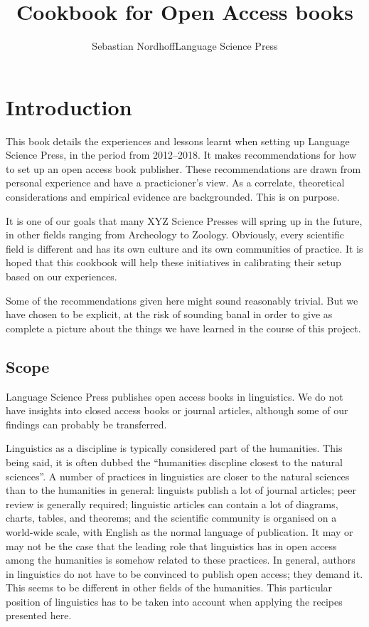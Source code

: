 \documentclass[guidelines,nonflat,modfonts] {langsci/langscibook}
\title{Cookbook for Open Access books}
\author{Sebastian Nordhoff\newlineCover Language Science Press}
\begin{document}
\maketitle
\frontmatter 
\tableofcontents 
\mainmatter
\chapter{Introduction}
\largerpage
This book details the experiences and lessons learnt when setting up Language Science Press, in the period from 2012--2018. It makes recommendations for how to set up an open access book publisher. These recommendations are drawn from personal experience and have a practicioner's view. As a correlate, theoretical considerations and empirical evidence are backgrounded. This is on purpose. 

It is one of our goals that many XYZ Science Presses will spring up in the future, in other fields ranging from Archeology to Zoology. Obviously, every scientific field is different and has its own culture and its own communities of practice. It is hoped that this cookbook will help these initiatives in calibrating their setup based on our experiences. 

Some of the recommendations given here might sound reasonably trivial. But we have chosen to be explicit, at the risk of sounding banal in order to give as complete a picture about the things we have learned in the course of this project.

\section{Scope}
Language Science Press publishes open access books in linguistics. We do not have insights into closed access books or journal articles, although some of our findings can probably be transferred. 

Linguistics as a discipline is typically considered part of the humanities. This being said, it is often dubbed the ``humanities discpline closest to the natural sciences''. A number of practices in linguistics are closer to the natural sciences than to the humanities in general: linguists publish a lot of journal articles; peer review is generally required; linguistic articles can contain a lot of diagrams, charts, tables, and theorems; and the scientific community is organised on a world-wide scale, with English as the normal language of publication. It may or may not be the case that the leading role that linguistics has in open access among the humanities is somehow related to these practices. In general, authors in linguistics do not have to be convinced to publish open access; they demand it. This seems to be different in other fields of the humanities. This particular position of linguistics has to be taken into account when applying the recipes presented here. 
\end{document}
